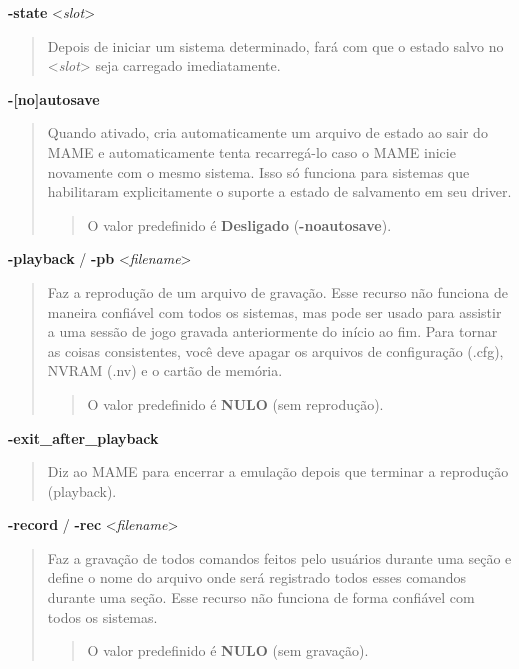 \documentclass[letterpaper,10pt,brazil]{sphinxmanual}
\begin{document}
\label{commandline/commandline-all:mame-commandline-state}
\textbf{-state} \textless{}\emph{slot}\textgreater{}
\begin{quote}

Depois de iniciar um sistema determinado, fará com que o estado
salvo no \textless{}\emph{slot}\textgreater{} seja carregado imediatamente.
\end{quote}
\label{commandline/commandline-all:mame-commandline-noautosave}
\textbf{-{[}no{]}autosave}
\begin{quote}

Quando ativado, cria automaticamente um arquivo de estado ao sair do
MAME e automaticamente tenta recarregá-lo caso o MAME inicie
novamente com o mesmo sistema. Isso só funciona para sistemas que
habilitaram explicitamente o suporte a estado de salvamento em seu
driver.
\begin{quote}

O valor predefinido é \textbf{Desligado} (\textbf{-noautosave}).
\end{quote}
\end{quote}
\label{commandline/commandline-all:mame-commandline-playback}
\textbf{-playback} / \textbf{-pb} \textless{}\emph{filename}\textgreater{}
\begin{quote}

Faz a reprodução de um arquivo de gravação. Esse recurso não
funciona de maneira confiável com todos os sistemas, mas pode ser
usado para assistir a uma sessão de jogo gravada anteriormente do
início ao fim. Para tornar as coisas consistentes, você deve apagar
os arquivos de configuração (.cfg), NVRAM (.nv) e o cartão de
memória.
\begin{quote}

O valor predefinido é \textbf{NULO} (sem reprodução).
\end{quote}
\end{quote}
\label{commandline/commandline-all:mame-commandline-exitafterplayback}
\textbf{-exit\_after\_playback}
\begin{quote}

Diz ao MAME para encerrar a emulação depois que terminar a
reprodução (playback).
\end{quote}
\label{commandline/commandline-all:mame-commandline-record}
\textbf{-record} / \textbf{-rec} \textless{}\emph{filename}\textgreater{}
\begin{quote}

Faz a gravação de todos comandos feitos pelo usuários durante uma
seção e define o nome do arquivo onde será registrado todos esses
comandos durante uma seção.
Esse recurso não funciona de forma confiável com todos os sistemas.
\begin{quote}

O valor predefinido é \textbf{NULO} (sem gravação).
\end{quote}
\end{quote}
\end{document}

